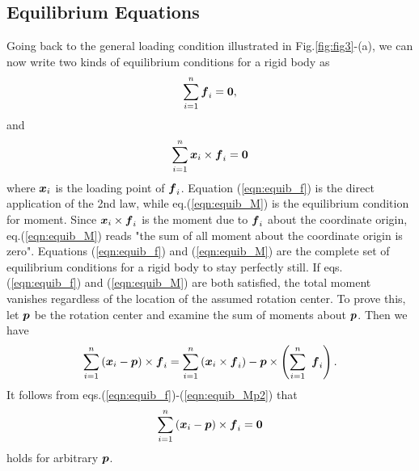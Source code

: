 \documentclass[10pt,a4j]{article}
\begin{document}
\subsection{Equilibrium Equations}
Going back to the general loading condition illustrated in Fig.\ref{fig:fig3}-(a), 
we can now write two kinds of equilibrium conditions 
for a rigid body as 
\begin{equation}
	\sum_{i=1}^n \mbox{\boldmath $f$}_i = \mbox{\boldmath $0$}, 
	\label{eqn:equib_f}
\end{equation}
and 
\begin{equation}
	\sum_{i=1}^n \mbox{\boldmath $x$}_i\times \mbox{\boldmath $f$}_i
	=
	\mbox{\boldmath $0$}
	\label{eqn:equib_M}
\end{equation}
where $\mbox{\boldmath $x$}_i$ is the loading point of $\mbox{\boldmath $f$}_i$.
Equation (\ref{eqn:equib_f}) is the direct application of the 2nd law, 
while eq.(\ref{eqn:equib_M}) is the equilibrium condition for moment.
Since $\mbox{\boldmath $x$}_i \times \mbox{\boldmath $f$}_i$ is the moment due to $\mbox{\boldmath $f$}_i$ about the 
coordinate origin, eq.(\ref{eqn:equib_M}) reads "the sum of all moment about 
the coordinate origin is zero".
Equations (\ref{eqn:equib_f}) and (\ref{eqn:equib_M}) are the complete
set of equilibrium conditions for a rigid body to stay perfectly still.
If eqs.(\ref{eqn:equib_f}) and (\ref{eqn:equib_M}) are both satisfied, 
the total moment vanishes regardless of the location of the assumed 
rotation center. To prove this, let $\mbox{\boldmath $p$}$ be the rotation center and 
examine the sum of moments about  $\mbox{\boldmath $p$}$. Then we have 
\begin{equation}
	\sum_{i=1}^n \left(\mbox{\boldmath $x$}_i-\mbox{\boldmath $p$}\right) \times \mbox{\boldmath $f$}_i
	=
	\sum_{i=1}^n \left( \mbox{\boldmath $x$}_i\times \mbox{\boldmath $f$}_i  \right)
	- 
	\mbox{\boldmath $p$} \times \left(\sum_{i=1}^n \ \mbox{\boldmath $f$}_i \right). 
	\label{eqn:equib_Mp2}
\end{equation}
It follows from eqs.(\ref{eqn:equib_f})-(\ref{eqn:equib_Mp2}) that 
\begin{equation}
	\sum_{i=1}^n \left(\mbox{\boldmath $x$}_i-\mbox{\boldmath $p$}\right) \times \mbox{\boldmath $f$}_i = \mbox{\boldmath $0$}
	\label{eqn:equib_Mp}
\end{equation}
holds for arbitrary $\mbox{\boldmath $p$}$.
\end{document}
